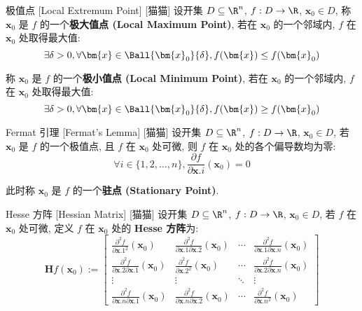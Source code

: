 \documentclass[UTF8]{ctexart}
\begin{document}
			\begin{dfn}
				[]
				{极值点}
				[Local Extremum Point]
				[猫猫]
				设开集 \(D\subseteq\R^n\), \(f:D\to\R\), \(\bm{x}_0\in D\), 称 \(\bm{x}_0\) 是 \(f\) 的一个\textbf{极大值点 (Local Maximum Point)}, 若在 \(\bm{x}_0\) 的一个邻域内, \(f\) 在 \(\bm{x}_0\) 处取得最大值:
				\[\exists\delta>0, \forall\bm{x}\in\Ball{\bm{x}_0}{\delta}, f(\bm{x})\leq f(\bm{x}_0)\]

				称 \(\bm{x}_0\) 是 \(f\) 的一个\textbf{极小值点 (Local Minimum Point)}, 若在 \(\bm{x}_0\) 的一个邻域内, \(f\) 在 \(\bm{x}_0\) 处取得最大值:
				\[\exists\delta>0, \forall\bm{x}\in\Ball{\bm{x}_0}{\delta}, f(\bm{x})\geq f(\bm{x}_0)\]
			\end{dfn}
			
			\begin{thm}
				[]
				{Fermat 引理}
				[Fermat's Lemma]
				[猫猫]
				设开集 \(D\subseteq\R^n\), \(f:D\to\R\), \(\bm{x}_0\in D\), 若 \(\bm{x}_0\) 是 \(f\) 的一个极值点, 且 \(f\) 在 \(\bm{x}_0\) 处可微, 则 \(f\) 在 \(\bm{x}_0\) 处的各个偏导数均为零: 
				\[\forall i\in\{1,2,\dots,n\}, \frac{\partial f}{\partial \bm{x}.i}(\bm{x}_0)=0\]

				此时称 \(\bm{x}_0\) 是 \(f\) 的一个\textbf{驻点 (Stationary Point)}. 
			\end{thm}
			
			\begin{dfn}
				[]
				{Hesse 方阵}
				[Hessian Matrix]
				[猫猫]
				设开集 \(D\subseteq\R^n\), \(f:D\to\R\), \(\bm{x}_0\in D\), 若 \(f\) 在 \(\bm{x}_0\) 处可微, 定义 \(f\) 在 \(\bm{x}_0\) 处的 \textbf{Hesse 方阵}为: 
				\[\bm{H}f(\bm{x}_0):=
				\begin{bmatrix}
					\frac{\partial^2 f}{\partial \bm{x}.1^2}(\bm{x}_0) & \frac{\partial^2 f}{\partial \bm{x}.1\partial \bm{x}.2}(\bm{x}_0) & \cdots & \frac{\partial^2 f}{\partial \bm{x}.1\partial \bm{x}.n}(\bm{x}_0)\\
					\frac{\partial^2 f}{\partial \bm{x}.2\partial \bm{x}.1}(\bm{x}_0) & \frac{\partial^2 f}{\partial \bm{x}.2^2}(\bm{x}_0) & \cdots & \frac{\partial^2 f}{\partial \bm{x}.2\partial \bm{x}.n}(\bm{x}_0)\\
					\vdots & \vdots & \ddots & \vdots\\
					\frac{\partial^2 f}{\partial \bm{x}.n\partial \bm{x}.1}(\bm{x}_0) & \frac{\partial^2 f}{\partial \bm{x}.n\partial \bm{x}.2}(\bm{x}_0) & \cdots & \frac{\partial^2 f}{\partial \bm{x}.n^2}(\bm{x}_0)
				\end{bmatrix}\]
			\end{dfn}
			
\end{document}
